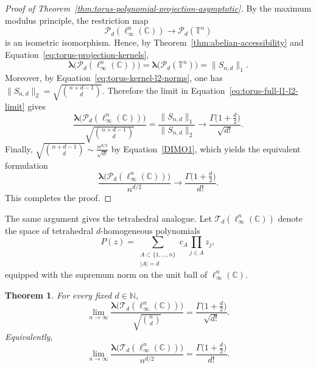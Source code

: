 \documentclass[11pt,showkeys]{amsart}
\newtheorem{theorem}{Theorem}[section]
\begin{document}
\begin{proof}[Proof of
Theorem~\ref{thm:torus-polynomial-projection-asymptotic}]
By the maximum modulus principle, the restriction map
\[
    \mathcal P_d(\ell_\infty^n(\mathbb C))
    \longrightarrow
    \mathcal P_d(\mathbb T^n)
\]
is an isometric isomorphism. Hence, by
Theorem~\ref{thm:abelian-accessibility} and
Equation~\eqref{eq:torus-projection-kernels},
\[
    \boldsymbol\lambda\bigl(\mathcal P_d(\ell_\infty^n(\mathbb C))\bigr)
    =
    \boldsymbol\lambda\bigl(\mathcal P_d(\mathbb T^n)\bigr)
    =
    \|S_{n,d}\|_1.
\]
Moreover, by Equation~\eqref{eq:torus-kernel-l2-norms}, one has
\(
    \|S_{n,d}\|_2
    =
    \sqrt{\binom{n+d-1}{d}}.
\)
Therefore the limit in Equation~\eqref{eq:torus-full-l1-l2-limit} gives
\[
    \frac{
        \boldsymbol\lambda\bigl(\mathcal P_d(\ell_\infty^n(\mathbb C))\bigr)
    }{
        \sqrt{\binom{n+d-1}{d}}
    }
    =
    \frac{\|S_{n,d}\|_1}{\|S_{n,d}\|_2}
    \longrightarrow
    \frac{\Gamma\bigl(1+\frac d2\bigr)}{\sqrt{d!}}.
\]
Finally,
\(
    \sqrt{\binom{n+d-1}{d}}
    \sim
    \frac{n^{d/2}}{\sqrt{d!}}
\)
 by Equation~\eqref{DIMO1},
which yields the equivalent formulation
\[
    \frac{
        \boldsymbol\lambda\bigl(\mathcal P_d(\ell_\infty^n(\mathbb C))\bigr)
    }{
        n^{d/2}
    }
    \longrightarrow
    \frac{\Gamma\bigl(1+\frac d2\bigr)}{d!}.
\]
This completes the proof.
\end{proof}

The same argument gives the tetrahedral analogue. Let
\(\mathcal T_d(\ell_\infty^n(\mathbb C))\) denote the space of
tetrahedral \(d\)-homogeneous polynomials
\[
    P(z)
    =
    \sum_{\substack{A\subset\{1,\ldots,n\}\\|A|=d}}
    c_A\prod_{j\in A}z_j,
\]
equipped with the supremum norm on the unit ball of
\(\ell_\infty^n(\mathbb C)\).

\begin{theorem}
\label{thm:torus-tetrahedral-projection-asymptotic}
For every fixed \(d\in\mathbb N\),
\[
    \lim_{n\to\infty}
    \frac{
        \boldsymbol\lambda\bigl(\mathcal T_d(\ell_\infty^n(\mathbb C))\bigr)
    }{
        \sqrt{\binom nd}
    }
    =
    \frac{\Gamma\bigl(1+\frac d2\bigr)}{\sqrt{d!}}.
\]
Equivalently,
\[
    \lim_{n\to\infty}
    \frac{
        \boldsymbol\lambda\bigl(\mathcal T_d(\ell_\infty^n(\mathbb C))\bigr)
    }{
        n^{d/2}
    }
    =
    \frac{\Gamma\bigl(1+\frac d2\bigr)}{d!}.
\]
\end{theorem}
\end{document}
